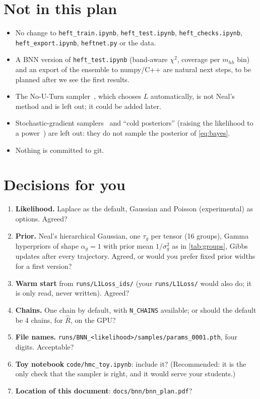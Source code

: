 \documentclass[11pt]{article}
\newcommand{\file}[1]{\nolinkurl{#1}}
\newcommand{\code}[1]{\texttt{#1}}
\newcommand{\mhh}{m_{hh}}
\begin{document}
\section{Not in this plan}
\begin{itemize}
  \item No change to \file{heft_train.ipynb}, \file{heft_test.ipynb},
    \file{heft_checks.ipynb}, \file{heft_export.ipynb}, \file{heftnet.py} or the data.
  \item A BNN version of \file{heft_test.ipynb} (band-aware $\chi^2$, coverage per
    $\mhh$ bin) and an export of the ensemble to numpy/C++ are natural next steps,
    to be planned after we see the first results.
  \item The No-U-Turn sampler~\cite{hoffman2014}, which chooses $L$ automatically, is
    not Neal's method and is left out; it could be added later.
  \item Stochastic-gradient samplers~\cite{chen2014} and ``cold posteriors''
    (raising the likelihood to a power~\cite{wenzel2020}) are left out: they do not
    sample the posterior of \cref{eq:bayes}.
  \item Nothing is committed to git.
\end{itemize}

\section{Decisions for you}
\label{sec:decisions}

\begin{keyidea}
\begin{enumerate}
  \item \textbf{Likelihood.} Laplace as the default, Gaussian and Poisson (experimental)
    as options. Agreed?
  \item \textbf{Prior.} Neal's hierarchical Gaussian, one $\tau_g$ per tensor (16 groups),
    Gamma hyperpriors of shape $\alpha_g = 1$ with prior mean $1/\sigma_g^2$ as in
    \cref{tab:groups}, Gibbs updates after every trajectory. Agreed, or would you prefer
    fixed prior widths for a first version?
  \item \textbf{Warm start} from \file{runs/L1Loss_ids/} (your \file{runs/L1Loss/} would
    also do; it is only read, never written). Agreed?
  \item \textbf{Chains.} One chain by default, with \code{N\_CHAINS} available; or
    should the default be 4 chains, for $\hat R$, on the GPU?
  \item \textbf{File names.} \file{runs/BNN_<likelihood>/samples/params_0001.pth},
    four digits. Acceptable?
  \item \textbf{Toy notebook} \file{code/hmc_toy.ipynb}: include it? (Recommended: it is
    the only check that the sampler is right, and it would serve your students.)
  \item \textbf{Location of this document}: \file{docs/bnn/bnn_plan.pdf}?
\end{enumerate}
\end{keyidea}
\end{document}
